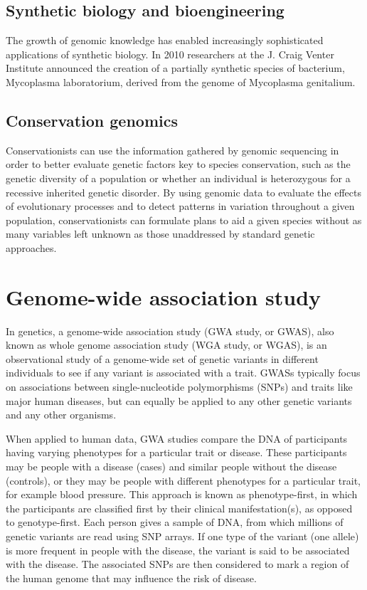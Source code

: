 \hypertarget{synthetic-biology-and-bioengineering}{%
\subsection{Synthetic biology and bioengineering}\label{synthetic-biology-and-bioengineering}}

The growth of genomic knowledge has enabled increasingly sophisticated applications of synthetic biology. In 2010 researchers at the J. Craig Venter Institute announced the creation of a partially synthetic species of bacterium, Mycoplasma laboratorium, derived from the genome of Mycoplasma genitalium.

\hypertarget{conservation-genomics}{%
\subsection{Conservation genomics}\label{conservation-genomics}}

Conservationists can use the information gathered by genomic sequencing in order to better evaluate genetic factors key to species conservation, such as the genetic diversity of a population or whether an individual is heterozygous for a recessive inherited genetic disorder. By using genomic data to evaluate the effects of evolutionary processes and to detect patterns in variation throughout a given population, conservationists can formulate plans to aid a given species without as many variables left unknown as those unaddressed by standard genetic approaches.

\hypertarget{genome-wide-association-study}{%
\section{Genome-wide association study}\label{genome-wide-association-study}}

In genetics, a genome-wide association study (GWA study, or GWAS), also known as whole genome association study (WGA study, or WGAS), is an observational study of a genome-wide set of genetic variants in different individuals to see if any variant is associated with a trait. GWASs typically focus on associations between single-nucleotide polymorphisms (SNPs) and traits like major human diseases, but can equally be applied to any other genetic variants and any other organisms.

When applied to human data, GWA studies compare the DNA of participants having varying phenotypes for a particular trait or disease. These participants may be people with a disease (cases) and similar people without the disease (controls), or they may be people with different phenotypes for a particular trait, for example blood pressure. This approach is known as phenotype-first, in which the participants are classified first by their clinical manifestation(s), as opposed to genotype-first. Each person gives a sample of DNA, from which millions of genetic variants are read using SNP arrays. If one type of the variant (one allele) is more frequent in people with the disease, the variant is said to be associated with the disease. The associated SNPs are then considered to mark a region of the human genome that may influence the risk of disease.

